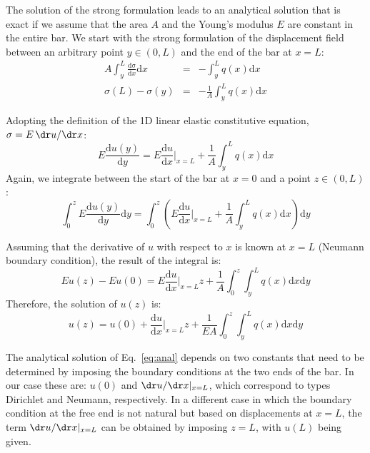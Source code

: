 \documentclass[spanish,a4paper,12pt]{article}
\begin{document}
The solution of the strong formulation leads to an analytical solution that is exact if we assume that the area $A$ and the Young's modulus $E$ are constant in the entire bar. We start with the strong formulation of the displacement field between an arbitrary point $y\in(0,L)$ and the end of the bar at $x=L$:
\begin{eqnarray}
A \int_y^L \frac{\mathrm{d \sigma}}{\mathrm{d} x} \mathrm{d} x &=& -\int_y^L  q(x) \mathrm{d} x \\
\sigma(L)-\sigma(y) &=& -\frac{1}{A}\int_y^L  q(x) \mathrm{d} x 
\end{eqnarray}

Adopting the definition of the 1D linear elastic constitutive equation, $\sigma = E\, \dr u/\dr x$:
\begin{equation}
E \frac{\mathrm{d} u(y)}{\mathrm{d} y} = E \frac{\mathrm{d} u}{\mathrm{d} x} \biggr\rvert_{x=L}  +\frac{1}{A}\int_y^L  q(x) \mathrm{d} x 
\end{equation}
Again, we integrate between the start of the bar at $x=0$ and a point $z\in(0,L)$:
\begin{equation}
\int_0^z E \frac{\mathrm{d} u(y)}{\mathrm{d} y} \mathrm{d} y = \int_0^z \left( E \frac{\mathrm{d} u}{\mathrm{d} x} \biggr\rvert_{x=L}  +\frac{1}{A}\int_y^L  q(x) \mathrm{d} x \right) \mathrm{d} y
\end{equation}

Assuming that the derivative of $u$ with respect to $x$ is known at $x=L$ (Neumann boundary condition), the result of the integral is:
\begin{equation}
E u(z) - E u(0) = E \frac{\mathrm{d} u}{\mathrm{d} x} \biggr\rvert_{x=L} z + \frac{1}{A}\int_0^z\int_y^L  q(x) \mathrm{d} x \mathrm{d} y
\end{equation}
Therefore, the solution of $u(z)$ is:
\begin{equation}\label{eq:anal}
u(z)  = u(0) +  \frac{\mathrm{d} u}{\mathrm{d} x} \biggr\rvert_{x=L} z  +\frac{1}{EA}\int_0^z\int_y^L  q(x) \mathrm{d} x \mathrm{d} y
\end{equation}

The analytical solution of Eq.~\eqref{eq:anal} depends on two constants that need to be determined by imposing the boundary conditions at the two ends of the bar. In our case these are: $u(0) $ and $\dr u / \dr x |_{x=L}$, which correspond to types Dirichlet and Neumann, respectively. In a different case in which the boundary condition at the free end is not natural but based on displacements at $x=L$, the term $\dr u / \dr x |_{x=L}$ can be obtained by imposing $z=L$, with $u(L)$ being given.
\end{document}
